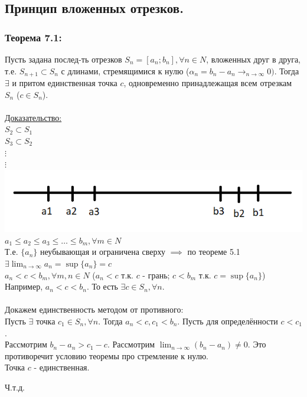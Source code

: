 \documentclass[12pt]{article}
\begin{document}
    \subsection{Принцип вложенных отрезков.}
    \subsubsection*{Теорема 7.1:}
    \indent Пусть задана послед-ть отрезков $S_{n} = [a_{n};b_{n}], \forall n \in N$, вложенных друг в друга, т.е. $S_{n+1} \subset S_{n}$ с длинами, стремящимися к нулю ($\alpha_{n} = b_{n} - a_{n} \rightarrow_{n\to\infty} 0)$. Тогда $\exists$ и притом единственная точка $c$, одновременно принадлежащая всем отрезкам $S_{n}$ ($c \in S_{n}$).\\\\
    \underline{Доказательство:}\\
    $S_{2} \subset S_{1}$\\
    $S_{3} \subset S_{2}$\\
    $\vdots$\\$\vdots$\\
    \includegraphics*{2.7.1}\\
    $a_{1} \le a_{2} \le a_{3} \le \dots \le b_{m}, \forall m \in N$\\
    Т.е. $\{a_{n}\}$ неубывающая и ограничена сверху $\implies$ по теореме 5.1 $\exists \lim_{n\to\infty}a_{n} = \sup\{a_{n}\} = c$\\
    $a_{n} < c < b_{m}, \forall m,n \in N$ ($a_{n} < c$ т.к. $c$ - грань; $c < b_{m}$ т.к. $c = \sup\{a_{n}\}$)\\
    Например, $a_{n} < c < b_{n}$. То есть $\exists c \in S_{n}, \forall n$.\\\\
    Докажем единственность методом от противного:\\
    Пусть $\exists$ точка $c_{1} \in S_{n}, \forall n$. Тогда $a_{n} < c, c_{1} < b_{n}$. Пусть для определённости $c < c_{1}$.\\
    Рассмотрим $b_{n} - a_{n} > c_{1} - c$. Рассмотрим $\lim_{n\to\infty}(b_{n} - a_{n}) \ne 0$. Это противоречит условию теоремы про стремление к нулю.\\
    Точка $c$ - единственная.
    \begin{center}
        Ч.т.д.
    \end{center}
    
\end{document}

